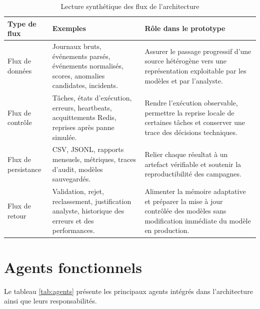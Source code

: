 \begin{table}[H]
\centering
\caption{Lecture synthétique des flux de l'architecture}
\label{tab:flux-architecture}
\scriptsize
\begin{tabularx}{\textwidth}{p{3.0cm}p{4.0cm}X}
\toprule
\textbf{Type de flux} & \textbf{Exemples} & \textbf{Rôle dans le prototype} \tabularnewline
\midrule
Flux de données &
Journaux bruts, événements parsés, événements normalisés, scores, anomalies candidates, incidents. &
Assurer le passage progressif d'une source hétérogène vers une représentation exploitable par les modèles et par l'analyste. \tabularnewline
Flux de contrôle &
Tâches, états d'exécution, erreurs, heartbeats, acquittements Redis, reprises après panne simulée. &
Rendre l'exécution observable, permettre la reprise locale de certaines tâches et conserver une trace des décisions techniques. \tabularnewline
Flux de persistance &
CSV, JSONL, rapports mensuels, métriques, traces d'audit, modèles sauvegardés. &
Relier chaque résultat à un artefact vérifiable et soutenir la reproductibilité des campagnes. \tabularnewline
Flux de retour &
Validation, rejet, reclassement, justification analyste, historique des erreurs et des performances. &
Alimenter la mémoire adaptative et préparer la mise à jour contrôlée des modèles sans modification immédiate du modèle en production. \tabularnewline
\bottomrule
\end{tabularx}
\end{table}

\section{Agents fonctionnels}

Le tableau \ref{tab:agents} présente les principaux agents intégrés dans l'architecture ainsi que leurs responsabilités.

